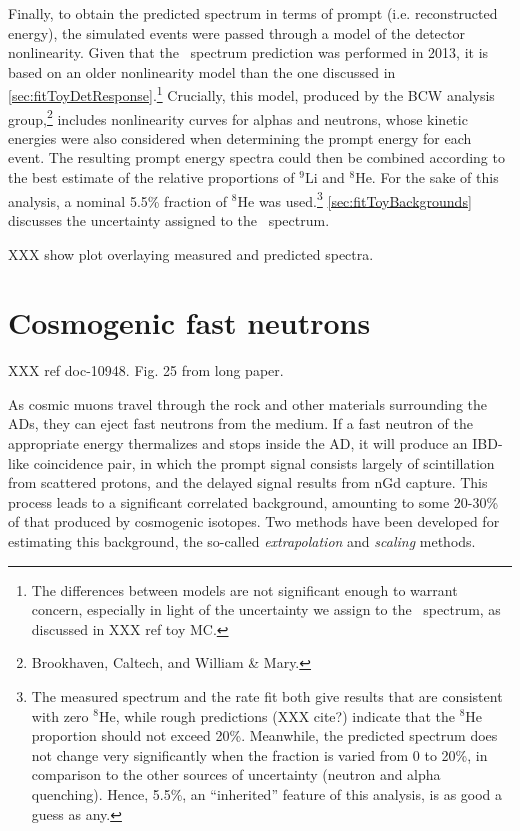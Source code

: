 \documentclass[../thesis.tex]{subfiles}
\begin{document}
Finally, to obtain the predicted spectrum in terms of prompt (i.e. reconstructed energy), the simulated events were passed through a model of the detector nonlinearity. Given that the \LiHe\ spectrum prediction was performed in 2013, it is based on an older nonlinearity model than the one discussed in \autoref{sec:fitToyDetResponse}.\footnote{The differences between models are not significant enough to warrant concern, especially in light of the uncertainty we assign to the \LiHe\ spectrum, as discussed in XXX ref toy MC.} Crucially, this model, produced by the BCW analysis group,\footnote{Brookhaven, Caltech, and William \& Mary.} includes nonlinearity curves for alphas and neutrons, whose kinetic energies were also considered when determining the prompt energy for each event. The resulting prompt energy spectra could then be combined according to the best estimate of the relative proportions of $^9$Li and $^8$He. For the sake of this analysis, a nominal 5.5\% fraction of $^8$He was used.\footnote{The measured spectrum and the rate fit both give results that are consistent with zero $^8$He, while rough predictions (XXX cite?) indicate that the $^8$He proportion should not exceed 20\%. Meanwhile, the predicted spectrum does not change very significantly when the fraction is varied from 0 to 20\%, in comparison to the other sources of uncertainty (neutron and alpha quenching). Hence, 5.5\%, an ``inherited'' feature of this analysis, is as good a guess as any.} \autoref{sec:fitToyBackgrounds} discusses the uncertainty assigned to the \LiHe\ spectrum.

XXX show plot overlaying measured and predicted spectra.

\section{Cosmogenic fast neutrons}
\label{sec:bkgFastn}

XXX ref doc-10948. Fig. 25 from long paper.

As cosmic muons travel through the rock and other materials surrounding the ADs, they can eject fast neutrons from the medium. If a fast neutron of the appropriate energy thermalizes and stops inside the AD, it will produce an IBD-like coincidence pair, in which the prompt signal consists largely of scintillation from scattered protons, and the delayed signal results from nGd capture. This process leads to a significant correlated background, amounting to some 20-30\% of that produced by cosmogenic isotopes. Two methods have been developed for estimating this background, the so-called \emph{extrapolation} and \emph{scaling} methods.
\end{document}
